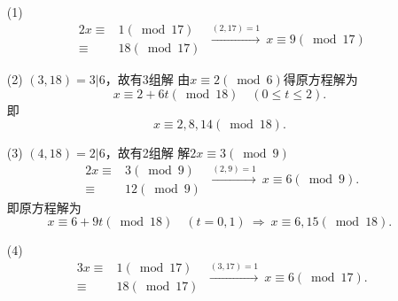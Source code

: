\documentclass[UTF8]{ctexart}
\begin{document}
\subsection{}   %
\begin{enumerate}
    \item [(1)]
    \[
        \begin{aligned}
            2x
            \equiv & 1 (\bmod 17)\\
            \equiv & 18 (\bmod 17)
        \end{aligned}      
        \ \xrightarrow{(2,17)=1}\ 
        x\equiv 9 (\bmod 17)
    \]
    \item [(2)]$(3,18)=3|6$，故有3组解
    由$x\equiv 2 (\bmod 6)$得原方程解为
    \[
        x\equiv 2 + 6t (\bmod 18)
        \quad (0\leq t \leq 2).
    \]
    即
    \[
        x\equiv 2,8,14 (\bmod 18)  .
    \]
    \item [(3)]$(4,18)=2|6$，故有2组解
    解$2x\equiv 3 (\bmod 9)$
    \[
        \begin{aligned}
            2x
            \equiv & 3 (\bmod 9)\\
            \equiv & 12 (\bmod 9)
        \end{aligned}
        \ \xrightarrow{(2,9)=1}\ 
        x\equiv 6(\bmod 9).
    \]
    即原方程解为
    \[
        x\equiv 6+9t (\bmod 18)\quad (t=0,1)
        \ \Rightarrow\ 
        x\equiv 6,15 (\bmod 18)  .
    \]
    
    \item [(4)]
    \[
        \begin{aligned}
            3x 
            \equiv & 1 (\bmod 17)\\
            \equiv & 18 (\bmod 17)
        \end{aligned}   
        \ \xrightarrow{(3,17)=1}\ 
        x\equiv 6(\bmod 17) .
    \]
    
\end{enumerate}
\end{document}

